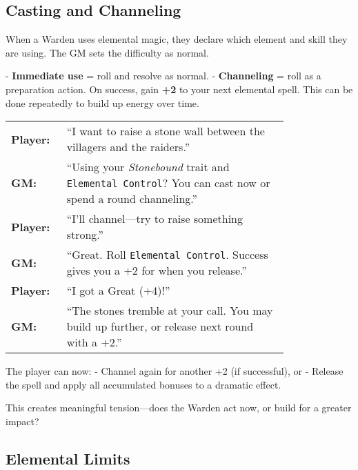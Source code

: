 \subsection{Casting and Channeling}


When a Warden uses elemental magic, they declare which element and skill they are using. The GM sets the difficulty as normal.

- \textbf{Immediate use} = roll and resolve as normal.
- \textbf{Channeling} = roll as a preparation action. On success, gain \textbf{+2} to your next elemental spell. This can be done repeatedly to build up energy over time.

\begin{WyrdExample}
    \begin{tabular}{@{}l p{0.8\linewidth}@{}}
        \textbf{Player:} & “I want to raise a stone wall between the villagers and the raiders.” \\
        \textbf{GM:} & “Using your \textit{Stonebound} trait and \texttt{Elemental Control}? You can cast now or spend a round channeling.” \\
        \textbf{Player:} & “I’ll channel—try to raise something strong.” \\
        \textbf{GM:} & “Great. Roll \texttt{Elemental Control}. Success gives you a +2 for when you release.” \\
        \textbf{Player:} & “I got a Great (+4)!” \\
        \textbf{GM:} & “The stones tremble at your call. You may build up further, or release next round with a +2.”
    \end{tabular}
\end{WyrdExample}

The player can now:
- Channel again for another +2 (if successful), or  
- Release the spell and apply all accumulated bonuses to a dramatic effect.

This creates meaningful tension—does the Warden act now, or build for a greater impact?

\subsection{Elemental Limits}


